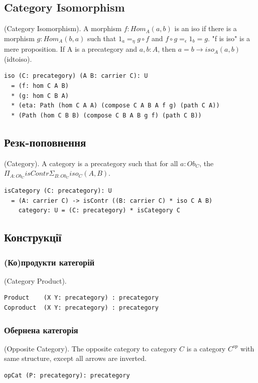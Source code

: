 \begin{definition}
\subsection{Category Isomorphism}
\begin{definition} (Category Isomorphism).
A morphism $f : Hom_A(a,b)$ is an iso
if there is a morphism $g: Hom_A(b,a)$ such that
$1_a =_\eta g \circ f$ and
$f \circ g =_\epsilon 1_b = g$. "f is iso" is
a mere proposition.
If A is a precategory and $a,b: A$,
then $a = b \rightarrow iso_A(a,b)$ (idtoiso).
\begin{lstlisting}
iso (C: precategory) (A B: carrier C): U
  = (f: hom C A B)
  * (g: hom C B A)
  * (eta: Path (hom C A A) (compose C A B A f g) (path C A))
  * (Path (hom C B B) (compose C B A B g f) (path C B))
\end{lstlisting}
\end{definition}

\subsection{Резк-поповнення}
\begin{definition} (Category).
A category is a precategory
such that for all $a:Ob_C$, the $\Pi_{A:Ob_C} isContr \Sigma_{B:Ob_C} iso_C(A,B)$.
\begin{lstlisting}
isCategory (C: precategory): U
  = (A: carrier C) -> isContr ((B: carrier C) * iso C A B)
    category: U = (C: precategory) * isCategory C
\end{lstlisting}
\end{definition}

\subsection{Конструкції}

\subsubsection{(Ко)продукти категорій}
\begin{definition} (Category Product).
\begin{lstlisting}
Product    (X Y: precategory) : precategory
Coproduct  (X Y: precategory) : precategory
\end{lstlisting}
\end{definition}

\subsubsection{Обернена категорія}
\begin{definition} (Opposite Category). The opposite category to category $C$
is a category $C^{op}$ with same structure, except all arrows are inverted.
\begin{lstlisting}
opCat (P: precategory): precategory
\end{lstlisting}
\end{definition}


\end{definition}
